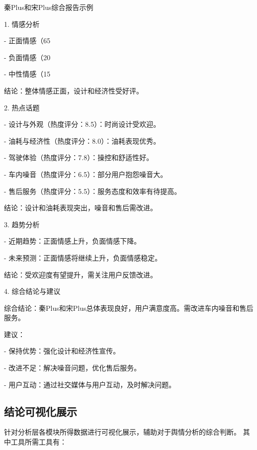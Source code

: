\documentclass[UTF8,a4paper,15pt,titlepage,oneside]{ctexbook}
\begin{document}
\begin{mdframed}[backgroundcolor=morandiLight!30, linecolor=morandiDark, linewidth=1pt]


\begin{center}
  秦Plus和宋Plus综合报告示例
\end{center}

1. 情感分析

- 正面情感（65%

- 负面情感（20%

- 中性情感（15%

结论：整体情感正面，设计和经济性受好评。


2. 热点话题

- 设计与外观（热度评分：8.5）：时尚设计受欢迎。

- 油耗与经济性（热度评分：8.0）：油耗表现优秀。

- 驾驶体验（热度评分：7.8）：操控和舒适性好。

- 车内噪音（热度评分：6.5）：部分用户抱怨噪音大。

- 售后服务（热度评分：5.5）：服务态度和效率有待提高。

结论：设计和油耗表现突出，噪音和售后需改进。


3. 趋势分析

- 近期趋势：正面情感上升，负面情感下降。

- 未来预测：正面情感将继续上升，负面情感稳定。

结论：受欢迎度有望提升，需关注用户反馈改进。


4. 综合结论与建议

综合结论：秦Plus和宋Plus总体表现良好，用户满意度高。需改进车内噪音和售后服务。

建议：

- 保持优势：强化设计和经济性宣传。

- 改进不足：解决噪音问题，优化售后服务。

- 用户互动：通过社交媒体与用户互动，及时解决问题。

\end{mdframed}


\subsection{结论可视化展示}

针对分析层各模块所得数据进行可视化展示，辅助对于舆情分析的综合判断。
其中工具所需工具有：
\end{document}
